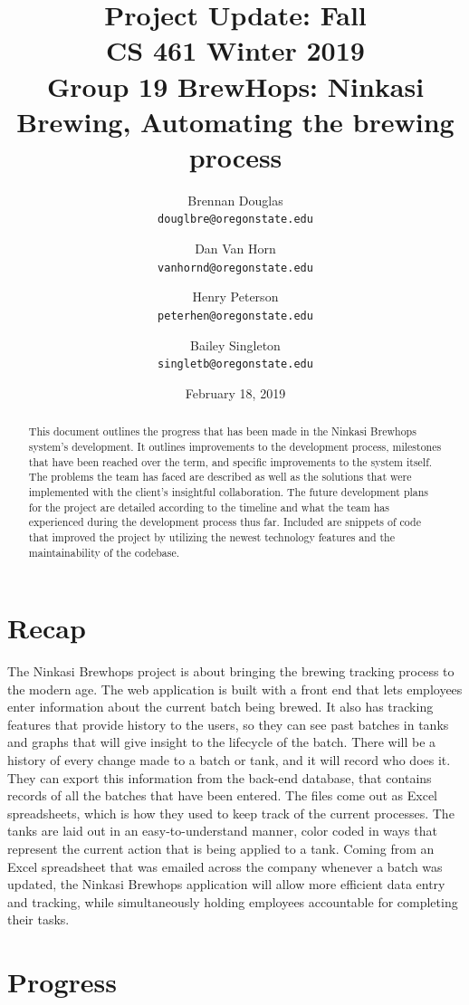 \documentclass[draftclsnofoot,onecolumn,journal,letterpaper,compsoc,10pt]{IEEEtran}
\title{Project Update: Fall\\\large CS 461 Winter 2019\\Group 19 BrewHops: Ninkasi Brewing, Automating the brewing process}
\author{
    Brennan Douglas \\
    \texttt{douglbre@oregonstate.edu} \\
    \and
    Dan Van Horn \\
    \texttt{vanhornd@oregonstate.edu} \\
    \and
    Henry Peterson \\
    \texttt{peterhen@oregonstate.edu} \\
    \and
    Bailey Singleton \\
    \texttt{singletb@oregonstate.edu} \\
}
\date{February 18, 2019}
\begin{document}
\begin{titlingpage}
    \maketitle
    \begin{abstract}
This document outlines the progress that has been made in the Ninkasi Brewhops system's development. It outlines improvements to the development process, milestones that have been reached over the term, and specific improvements to the system itself. The problems the team has faced are described as well as the solutions that were implemented with the client's insightful collaboration. The future development plans for the project are detailed according to the timeline and what the team has experienced during the development process thus far. Included are snippets of code that improved the project by utilizing the newest technology features and the maintainability of the codebase.
    \end{abstract}
    \pagebreak
    \tableofcontents
\end{titlingpage}

\section{Recap}

The Ninkasi Brewhops project is about bringing the brewing tracking process to the modern age. The web application is built with a front end that lets employees enter information about the current batch being brewed. It also has tracking features that provide history to the users, so they can see past batches in tanks and graphs that will give insight to the lifecycle of the batch. There will be a history of every change made to a batch or tank, and it will record who does it. They can export this information from the back-end database, that contains records of all the batches that have been entered. The files come out as Excel spreadsheets, which is how they used to keep track of the current processes. The tanks are laid out in an easy-to-understand manner, color coded in ways that represent the current action that is being applied to a tank. Coming from an Excel spreadsheet that was emailed across the company whenever a batch was updated, the Ninkasi Brewhops application will allow more efficient data entry and tracking, while simultaneously holding employees accountable for completing their tasks. 


\section{Progress}
\end{document}
